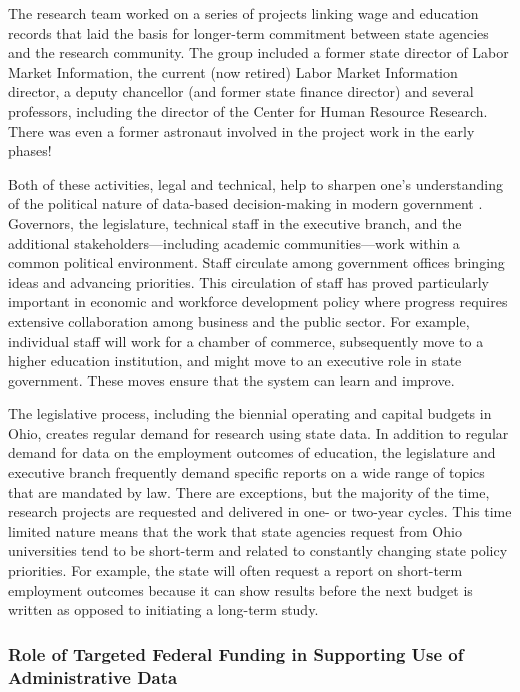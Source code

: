 The research team worked on a series of projects linking wage and education records that laid the basis for longer-term commitment between state agencies and the research community. The group included a former state director of Labor Market Information, the current (now retired) Labor Market Information director, a deputy chancellor (and former state finance director) and several professors, including the director of the Center for Human Resource Research. There was even a former astronaut involved in the project work in the early phases!

Both of these activities, legal and technical, help to sharpen one's understanding of the political nature of data-based decision-making in modern government \citep{stone2012}. Governors, the legislature, technical staff in the executive branch, and the additional stakeholders---including academic communities---work within a common political environment. Staff circulate among government offices bringing ideas and advancing priorities. This circulation of staff has proved particularly important in economic and workforce development policy where progress requires extensive collaboration among business and the public sector. For example, individual staff will work for a chamber of commerce, subsequently move to a higher education institution, and might move to an executive role in state government. These moves ensure that the system can learn and improve.

The legislative process, including the biennial operating and capital budgets in Ohio, creates regular demand for research using state data. In addition to regular demand for data on the employment outcomes of education, the legislature and executive branch frequently demand specific reports on a wide range of topics that are mandated by law. There are exceptions, but the majority of the time, research projects are requested and delivered in one- or two-year cycles. This time limited nature means that the work that state agencies request from Ohio universities tend to be short-term and related to constantly changing state policy priorities. For example, the state will often request a report on short-term employment outcomes because it can show results before the next budget is written as opposed to initiating a long-term study.

\hypertarget{role-of-targeted-federal-funding-in-supporting-use-of-administrative-data}{%
\subsubsection*{Role of Targeted Federal Funding in Supporting Use of Administrative Data}\label{role-of-targeted-federal-funding-in-supporting-use-of-administrative-data}}

